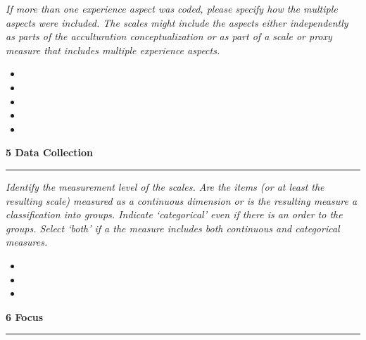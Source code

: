 \documentclass[10pt,a4paper]{protocol}
\newcommand\category[2]{
{\Large\bfseries\color{emphasis} \vspace{0.25em} #1 \hspace{0.5em} #2 \\ [-0.6em] \rule{\textwidth}{0.4pt} \vspace{0.25em}}
}
\begin{document}
\textit{If more than one experience aspect was coded, please specify how the multiple aspects were included. The scales might include the aspects either independently as parts of the acculturation conceptualization or as part of a scale or proxy measure that includes multiple experience aspects.}
\vspace{0.5em}
\begin{itemize}
	\item {}
	\item {}
	\item {}
	\item {}
	\item {}
\end{itemize}
\divider

\category{5}{Data Collection}

\textit{Identify the measurement level of the scales. Are the items (or at least the resulting scale) measured as a continuous dimension or is the resulting measure a classification into groups. Indicate `categorical' even if there is an order to the groups. Select `both' if a the measure includes both continuous and categorical measures.}
\vspace{0.5em}
\begin{itemize}
	\item {}
	\item {}
	\item {}
\end{itemize}
\divider

\category{6}{Focus}
\end{document}
